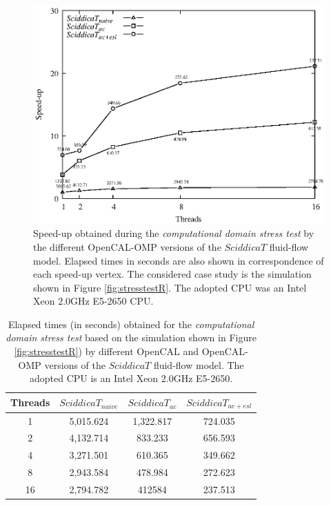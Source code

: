 \begin{figure}
	\begin{center}
		\includegraphics[width=1.0\textwidth]{./images/opencal/Figure12_new}
		\caption{Speed-up obtained during the \emph{computational
				domain stress test} by the different OpenCAL-OMP versions
			of the $SciddicaT$ fluid-flow model. Elapsed times in
			seconds are also shown in correspondence of each speed-up
			vertex. The considered case study is the simulation shown in
			Figure \ref{fig:stresstestR}. The adopted CPU was an Intel
			Xeon 2.0GHz E5-2650 CPU.}
		\label{gr:sciddicaT-OMP-absolute-speed-up-stressR}
	\end{center}
\end{figure}
\begin{table}
	\centering
	\begin{tabular}{cccc}
		\hline Threads & $SciddicaT_{naive}$ & $SciddicaT_{ac}$ &
		$SciddicaT_{ac+esl}$\\ \hline 1 & 5,015.624 & 1,322.817 &
		724.035\\ 2 & 4,132.714 & 833.233 & 656.593\\ 4 & 3,271.501 &
		610.365 & 349.662\\ 8 & 2,943.584 & 478.984 & 272.623\\ 16 &
		2,794.782 & 412584 & 237.513\\ \hline
	\end{tabular}
	\caption[Elapsed times obtained for the \emph{computational domain stress test} by different OpenCAL and OpenCAL-OMP versions
	of the $SciddicaT$ fluid-flow model.]{Elapsed times (in seconds) obtained for the \emph{computational domain stress test} based on the simulation shown in Figure \ref{fig:stresstestR}) by different OpenCAL and OpenCAL-OMP versions
		of the $SciddicaT$ fluid-flow model. The adopted CPU is an Intel Xeon
		2.0GHz E5-2650.}
	\label{tab:sciddicaT-OMP-execution-times-stressR}
\end{table}
